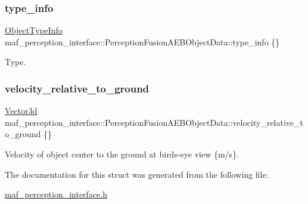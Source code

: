 \subsubsection{\texorpdfstring{type\+\_\+info}{type\_info}}
{\footnotesize\ttfamily \hyperlink{structmaf__perception__interface_1_1ObjectTypeInfo}{Object\+Type\+Info} maf\+\_\+perception\+\_\+interface\+::\+Perception\+Fusion\+A\+E\+B\+Object\+Data\+::type\+\_\+info \{\}}



Type. 

\mbox{\label{structmaf__perception__interface_1_1PerceptionFusionAEBObjectData_a6e3d044f87c811b5d7b1a7d0c6fbd33f}} 
\subsubsection{\texorpdfstring{velocity\+\_\+relative\+\_\+to\+\_\+ground}{velocity\_relative\_to\_ground}}
{\footnotesize\ttfamily \hyperlink{structmaf__perception__interface_1_1Vector3d}{Vector3d} maf\+\_\+perception\+\_\+interface\+::\+Perception\+Fusion\+A\+E\+B\+Object\+Data\+::velocity\+\_\+relative\+\_\+to\+\_\+ground \{\}}



Velocity of object center to the ground at bird\textquotesingle{}s-\/eye view \{m/s\}. 



The documentation for this struct was generated from the following file\+:\begin{DoxyCompactItemize}
\item 
\hyperlink{maf__perception__interface_8h}{maf\+\_\+perception\+\_\+interface.\+h}\end{DoxyCompactItemize}
